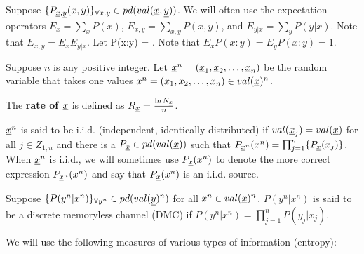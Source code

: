Suppose
$\{P_{\rvx,\rvy}(x,y)\}_{\forall x,y}
\in pd(val(\rvx,\rvy))$.
We will often use
the expectation operators
$E_x = \sum_x P(x)$,
 $E_{x,y}=\sum_{x,y} P(x,y)$,
 and
$E_{y|x}=\sum_y P(y|x)$.
Note that $E_{x,y} = E_x E_{y|x}$.
Let
\beq
P(x:y) = 
\;.
\eeq
Note that
$E_{x} P(x:y) = E_{y} P(x:y)=1$.

Suppose
$n$ is any positive integer.
Let $\rvx^n = (\rvx_1, \rvx_2, \ldots, \rvx_n)$
be the random variable that takes one values
$x^n = (x_1, x_2, \ldots, x_n)\in val(\rvx)^n$.

The {\bf rate of $\rvx$} is defined as
$R_\rvx = \frac{\ln N_\rvx}{n}$.


$\rvx^n$ is said to be i.i.d.
(independent, identically
distributed)
if $val(\rvx_j)=val(\rvx)$ for all $j\in Z_{1,n}$
and there is a $P_\rvx\in pd(val(\rvx))$
such that
$P_{\rvx^n}(x^n)=
\prod_{j=1}^n\{
P_\rvx(x_j)\}$.
When $\rvx^n$ is i.i.d.,
we will sometimes use
$P_{\rvx}(x^n)$ to denote
the more correct expression
$P_{\rvx^n}(x^n)$
and say that
$P_\rvx(x^n)$
is an i.i.d. source.

Suppose $\{P(y^n|x^n)\}_{\forall y^n}\in pd(val(\rvy)^n)$
for all $x^n\in val(\rvx)^n$.
$P(y^n|x^n)$
is said to be a discrete memoryless channel (DMC)
if
$P(y^n|x^n) =\prod_{j=1}^{n}P(y_j|x_j)$.

We will use the following
measures of various
types of information (entropy):

